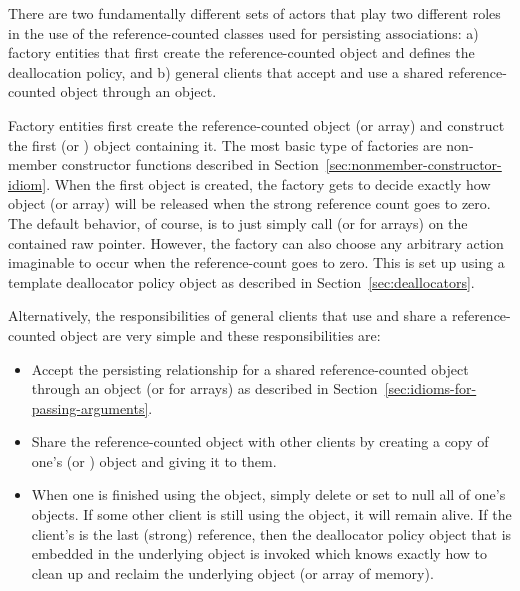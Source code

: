 \documentclass[pdf,ps2pdf,11pt]{SANDreport}
\begin{document}
There are two fundamentally different sets of actors that play two
different roles in the use of the reference-counted classes used for
persisting associations: a) factory entities that first create the
reference-counted object {} and defines the deallocation
policy, and b) general clients that accept and use a shared
reference-counted object {} through an {} object.

Factory entities first create the reference-counted object (or array)
and construct the first {} (or {}) object
containing it.  The most basic type of factories are non-member
constructor functions described in
Section~\ref{sec:nonmember-constructor-idiom}.  When the first
{} object is created, the factory gets to decide exactly how
object (or array) will be released when the strong reference count
goes to zero.  The default behavior, of course, is to just simply call
{} (or {} for arrays) on the contained raw
pointer.  However, the factory can also choose any arbitrary action
imaginable to occur when the reference-count goes to zero.  This is
set up using a template deallocator policy object as described in
Section~\ref{sec:deallocators}.

Alternatively, the responsibilities of general clients that use and
share a reference-counted object are very simple and these
responsibilities are:

\begin{itemize}

{}\item Accept the persisting relationship for a shared
reference-counted object through an {} object (or
{} for arrays) as described in
Section~\ref{sec:idioms-for-passing-arguments}.

{}\item Share the reference-counted object with other clients by
creating a copy of one's {} (or {}) object and
giving it to them.

{}\item When one is finished using the object, simply delete or set to
null all of one's {} objects.  If some other client is still
using the object, it will remain alive.  If the client's is the last
(strong) reference, then the deallocator policy object that is
embedded in the underlying {} object is invoked which
knows exactly how to clean up and reclaim the underlying object (or
array of memory).

\end{itemize}
\end{document}
